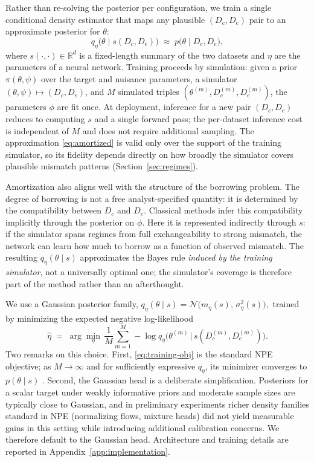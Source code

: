 Rather than re-solving the posterior per configuration, we train a single
conditional density estimator that maps any plausible
$(D_c, D_e)$ pair to an approximate posterior for $\theta$:
\begin{equation}
  q_{\eta}\!\bigl(\theta \mid s(D_c, D_e)\bigr)
  \;\approx\;
  p\!\bigl(\theta \mid D_c, D_e\bigr),
  \label{eq:amortized}
\end{equation}
where $s(\cdot,\cdot) \in \mathbb{R}^d$ is a fixed-length summary of the
two datasets and $\eta$ are the parameters of a neural network.
Training proceeds by simulation: given a prior $\pi(\theta, \psi)$ over the
target and nuisance parameters, a simulator
$(\theta, \psi) \mapsto (D_c, D_e)$, and $M$ simulated triples
$(\theta^{(m)}, D_c^{(m)}, D_e^{(m)})$, the parameters $\phi$ are
fit once. At deployment, inference for a new pair
$(D_c, D_e)$ reduces to computing $s$ and a single forward pass;
the per-dataset inference cost is independent of $M$ and does not require additional
sampling.
The approximation \eqref{eq:amortized} is valid only over the support of
the training simulator, so its fidelity depends directly on how broadly
the simulator covers plausible mismatch patterns (Section~\ref{sec:regimes}).

Amortization also aligns well with the structure of the borrowing problem.
The degree of borrowing is not a free analyst-specified quantity: it is
determined by the compatibility between $D_c$ and $D_e$. Classical
methods infer this compatibility implicitly through the posterior on $\phi$.
Here it is represented indirectly through $s$: if the simulator spans
regimes from full exchangeability to strong mismatch, the network can
learn how much to borrow as a function of observed mismatch.
The resulting $q_{\eta}(\theta \mid s)$ approximates the Bayes rule
\emph{induced by the training simulator}, not a universally optimal one;
the simulator's coverage is therefore part of the method rather than an
afterthought.

We use a Gaussian posterior family,
$
  q_{\eta}(\theta \mid s) = \mathcal{N}\!\bigl(m_{\eta}(s),\, \sigma_{\eta}^2(s)\bigr),
$
trained by minimizing the expected negative log-likelihood
\begin{equation}
  \widehat{\eta}
  \;=\;
  \arg\min_{\eta}\,
  \frac{1}{M}\sum_{m=1}^{M}
    -\log q_{\eta}\!\bigl(\theta^{(m)} \,\big|\, s(D_c^{(m)}, D_e^{(m)})\bigr).
  \label{eq:training-obj}
\end{equation}
Two remarks on this choice.
First, \eqref{eq:training-obj} is the standard NPE objective; as
$M \to \infty$ and for sufficiently expressive $q_\eta$, its minimizer
converges to $p(\theta \mid s)$
\citep{papamakarios2016fast,greenberg2019automatic}.
Second, the Gaussian head is a deliberate simplification.
Posteriors for a scalar target under weakly informative priors
and moderate sample sizes are typically close to Gaussian, and in
preliminary experiments richer density families standard in NPE
(normalizing flows, mixture heads) did not yield measurable gains in this
setting while introducing additional calibration concerns. We therefore
default to the Gaussian head.
Architecture and training details are reported in
Appendix~\ref{app:implementation}.

